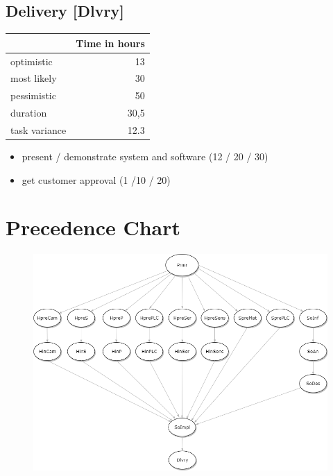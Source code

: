 \subsection*{Delivery [Dlvry]}
\label{sec:org1388080}
\begin{center}
\begin{tabular}{|l|r|}
	\hline
	& Time in hours\\
	\hline
	optimistic & 13\\
	\hline
	most likely & 30\\
	\hline
	pessimistic & 50\\
	\hline
	\hline
	duration & 30,5\\
	\hline
	task variance & 12.3\\
	\hline
\end{tabular}
\end{center}
\begin{itemize}
\item present / demonstrate system and software (12 / 20 / 30)
\item get customer approval (1 /10 / 20)
\end{itemize}
\newpage
\section{Precedence Chart}
\begin{figure}[h]
	\centering
	\includegraphics[width=\textwidth]{images/precedenceChart}
\end{figure}

